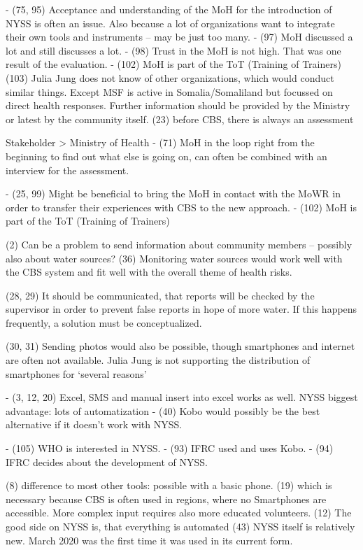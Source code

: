 -	(75, 95) Acceptance and understanding of the MoH for the introduction of NYSS is often an issue. Also because a lot of organizations want to integrate their own tools and instruments – may be just too many.
-	(97) MoH discussed a lot and still discusses a lot.
-	(98) Trust in the MoH is not high. That was one result of the evaluation.
-	(102) MoH is part of the ToT (Training of Trainers)
(103) Julia Jung does not know of other organizations, which would conduct similar things. Except MSF is active in Somalia/Somaliland but focussed on direct health responses. Further information should be provided by the Ministry or latest by the community itself.
(23) before CBS, there is always an assessment

Stakeholder > Ministry of Health
-	(71) MoH in the loop right from the beginning to find out what else is going on, can often be combined with an interview for the assessment.

-	(25, 99) Might be beneficial to bring the MoH in contact with the MoWR in order to transfer their experiences with CBS to the new approach.
-	(102) MoH is part of the ToT (Training of Trainers)

(2) Can be a problem to send information about community members – possibly also about water sources? 
(36) Monitoring water sources would work well with the CBS system and fit well with the overall theme of health risks.

(28, 29) It should be communicated, that reports will be checked by the supervisor in order to prevent false reports in hope of more water. If this happens frequently, a solution must be conceptualized.

(30, 31) Sending photos would also be possible, though smartphones and internet are often not available. Julia Jung is not supporting the distribution of smartphones for ‘several reasons’

-	(3, 12, 20) Excel, SMS and manual insert into excel works as well. NYSS biggest advantage: lots of automatization
-	(40) Kobo would possibly be the best alternative if it doesn’t work with NYSS.

-	(105) WHO is interested in NYSS.
-	(93) IFRC used and uses Kobo.
-	(94) IFRC decides about the development of NYSS.

(8) difference to most other tools: possible with a basic phone. (19) which is necessary because CBS is often used in regions, where no Smartphones are accessible. More complex input requires also more educated volunteers.
(12) The good side on NYSS is, that everything is automated
(43) NYSS itself is relatively new. March 2020 was the first time it was used in its current form.


